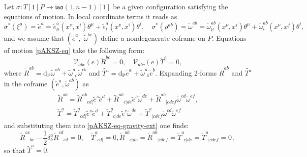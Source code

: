 \documentclass[a4paper,12pt]{article}
\numberwithin{equation}{section} %
\renewcommand{\tilde}{\widetilde}
\numberwithin{equation}{section}
\newcommand{\atheta}{\theta}
\newcommand{\dP}{\mathrm{d_P}}
\begin{document}
Let $\sigma: T[1]P \to \mathfrak{iso}(1,n-1)[1]$ be a given configuration satisfying the equations of motion. In local coordinate terms it reads as 
\begin{equation}
    \sigma^\ast(\xi^a) = \tilde{e}^a = \tilde{e}^a_\mu(x^\nu,x^i)\atheta^\mu + \tilde{e}^a_i(x^\nu,x^i)\atheta^i, \quad \sigma^\ast(\rho^{ab}) = \tilde{\omega}^{ab} =  \tilde{\omega}^{ab}_\mu (x^\nu,x^i)\atheta^\mu + \tilde{\omega}^{ab}_i(x^\nu,x^j)\atheta^i,
\end{equation}
and we assume  that $(\tilde{e}^a,\,\,\tilde{\omega}^{bc})$ define a nondegenerate coframe on $P$. Equations of motion \eqref{pAKSZ-eq} take the following form:
\begin{equation}\label{pAKSZ-eq-gravity-ext}
    \mathcal{V}_{abc}(e)\tilde{R}^{bc} =0, \quad \mathcal{V}_{abc}(e)\tilde{T}^c = 0,
\end{equation}
where $\tilde{R}^{ab} = \dP\tilde{\omega}^{ab} + \tilde{\omega}^a_{\enspace c}\tilde{\omega}^{cb}$ and  $\tilde{T^a} = \dP \tilde{e}^a + \tilde{\omega}^a_{\enspace b}\tilde{e}^b$. Expanding 2-forms $\tilde{R}^{ab}$ and $\tilde{T^a}$ in the coframe $(\tilde{e}^a, \tilde{\omega}^{ab})$ as
\begin{equation}
\begin{gathered}
    \tilde{R}^{ab} = \tilde{R}^{ab}_{\enspace\enspace cd|}\tilde{e}^c \tilde{e}^d + \tilde{R}^{ab}_{\enspace\enspace c|de} \tilde{e}^c \tilde{\omega}^{de} + \tilde{R}^{ab}_{\enspace\enspace |cdef}\tilde{\omega}^{cd}\tilde{\omega}^{ef},\\
    \tilde{T}^{a} = \tilde{T}^{a}_{\enspace cd|}\tilde{e}^c \tilde{e}^d + \tilde{T}^{a}_{\enspace c|de} \tilde{e}^c \tilde{\omega}^{de} + \tilde{T}^{a}_{\enspace |cdef}\tilde{\omega}^{cd}\tilde{\omega}^{ef}
\end{gathered}
\end{equation}
and substituting them into \eqref{pAKSZ-eq-gravity-ext} one finds:
\begin{subequations}
\begin{equation}\label{gravity-einst-eq}
    \tilde{R}^{ac}_{\enspace\enspace bc} - \frac{1}{2}\delta^a_b\tilde{R}^{cd}_{\enspace\enspace cd} = 0, \quad \tilde{T}^{a}_{\enspace cd|} = 0,
\end{equation}
\begin{equation}\label{gravity-rheonomy-eq}
    \tilde{R}^{ab}_{\enspace\enspace c|de} = \tilde{R}^{ab}_{\enspace\enspace |cdef} = \tilde{T}^{a}_{\enspace c|de} = \tilde{T}^{a}_{\enspace |cdef} =0\,,
\end{equation}
\end{subequations}
so that $\tilde{T}^a = 0$.
\end{document}
